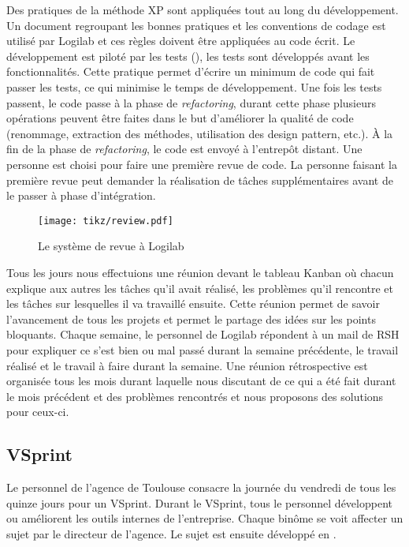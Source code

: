 Des pratiques de la méthode XP sont appliquées tout au long du développement.
Un document regroupant les bonnes pratiques et les conventions de codage est
utilisé par Logilab et ces règles doivent être appliquées au code écrit. Le
développement est piloté par les tests (), les tests sont
développés avant les fonctionnalités. Cette pratique permet d'écrire un minimum
de code qui fait passer les tests, ce qui minimise le temps de développement.
Une fois les tests passent, le code passe à la phase de \textit{refactoring},
durant cette phase plusieurs opérations peuvent être faites dans le but
d'améliorer la qualité de code (renommage, extraction des méthodes, utilisation
des design pattern, etc.). \`A la fin de la phase de \textit{refactoring}, le
code est envoyé à l’entrepôt distant. Une personne est choisi pour faire une
première revue de code. La personne faisant la première revue peut demander la
réalisation de tâches supplémentaires avant de le passer à phase d'intégration. 

\begin{figure} 
    \centering 
    \texttt{[image: tikz/review.pdf]}
    \caption{Le système de revue à Logilab} 
    \label{fig:review} 
\end{figure}

Tous les jours nous effectuions une réunion devant le tableau Kanban où chacun
explique aux autres les tâches qu'il avait réalisé, les problèmes qu'il
rencontre et les tâches sur lesquelles il va travaillé ensuite. Cette réunion
permet de savoir l'avancement de tous les projets et permet le partage des
idées sur les points bloquants. Chaque semaine, le personnel de Logilab
répondent à un mail de RSH pour expliquer ce s'est bien ou mal passé durant la
semaine précédente, le travail réalisé et le travail à faire durant la semaine.
Une réunion rétrospective est organisée tous les mois durant laquelle nous
discutant de ce qui a été fait durant le mois précédent et des problèmes
rencontrés et nous proposons des solutions pour ceux-ci. 

\subsection{VSprint} 
Le personnel de l'agence de Toulouse consacre la journée du vendredi de tous 
les quinze jours pour un VSprint. Durant le VSprint, tous le personnel développent 
ou améliorent les outils internes de l'entreprise. Chaque binôme se voit affecter 
un sujet par le directeur de l'agence. Le sujet est ensuite développé en 
.

